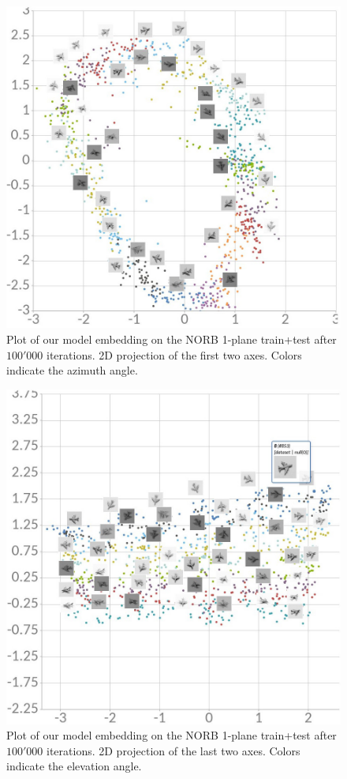 \documentclass[a4paper,12pt]{report}
\begin{document}
\begin{figure}
    \centering
    \includegraphics[width=\textwidth]{thesis_figures/norb_cl2d.jpg}
    \caption{Plot of our model embedding on the NORB 1-plane train+test after $100'000$ iterations. 2D projection of the first two axes. Colors indicate the azimuth angle.}
    \label{fig:norb_cl2d_embedding_1}
\end{figure}

\begin{figure}
    \centering
    \includegraphics[width=\textwidth]{thesis_figures/norb_cl2d2.jpg}
    \caption{Plot of our model embedding on the NORB 1-plane train+test after $100'000$ iterations. 2D projection of the last two axes. Colors indicate the elevation angle.}
    \label{fig:norb_cl2d_embedding_2}
\end{figure}
\end{document}
